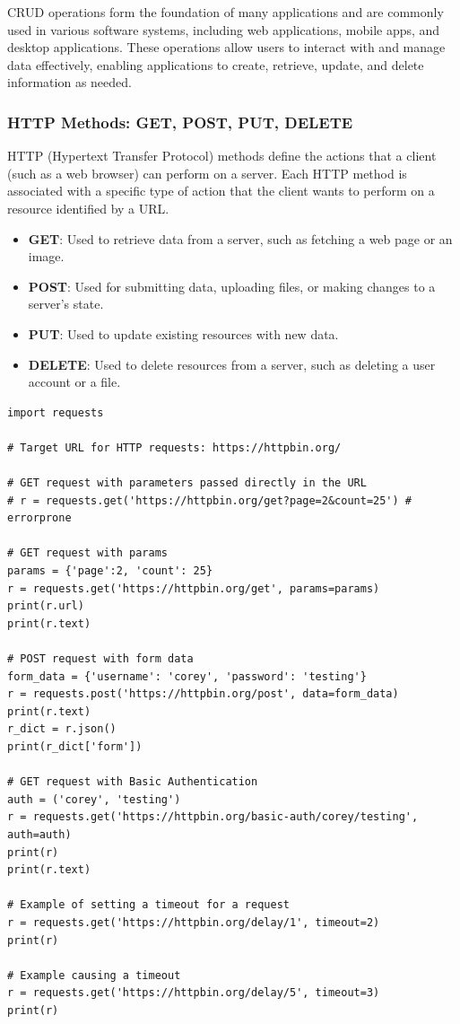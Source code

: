 CRUD operations form the foundation of many applications and are commonly used in various software systems, including web applications, mobile apps, and desktop applications. These operations allow users to interact with and manage data effectively, enabling applications to create, retrieve, update, and delete information as needed.

\subsubsection{HTTP Methods: GET, POST, PUT, DELETE}

HTTP (Hypertext Transfer Protocol) methods define the actions that a client (such as a web browser) can perform on a server. Each HTTP method is associated with a specific type of action that the client wants to perform on a resource identified by a URL.

\begin{itemize}
    \item \textbf{GET}: Used to retrieve data from a server, such as fetching a web page or an image.
    
    \item \textbf{POST}: Used for submitting data, uploading files, or making changes to a server's state.
    
    \item \textbf{PUT}: Used to update existing resources with new data.
    
    \item \textbf{DELETE}: Used to delete resources from a server, such as deleting a user account or a file.
\end{itemize}

\newpage
\begin{codebox}
\begin{verbatim}
import requests

# Target URL for HTTP requests: https://httpbin.org/

# GET request with parameters passed directly in the URL
# r = requests.get('https://httpbin.org/get?page=2&count=25') # errorprone

# GET request with params
params = {'page':2, 'count': 25}
r = requests.get('https://httpbin.org/get', params=params)
print(r.url)
print(r.text)

# POST request with form data
form_data = {'username': 'corey', 'password': 'testing'}
r = requests.post('https://httpbin.org/post', data=form_data)
print(r.text)
r_dict = r.json()
print(r_dict['form'])

# GET request with Basic Authentication
auth = ('corey', 'testing')
r = requests.get('https://httpbin.org/basic-auth/corey/testing', auth=auth)
print(r)
print(r.text)

# Example of setting a timeout for a request
r = requests.get('https://httpbin.org/delay/1', timeout=2)
print(r)

# Example causing a timeout
r = requests.get('https://httpbin.org/delay/5', timeout=3)
print(r)
\end{verbatim}
\end{codebox}

